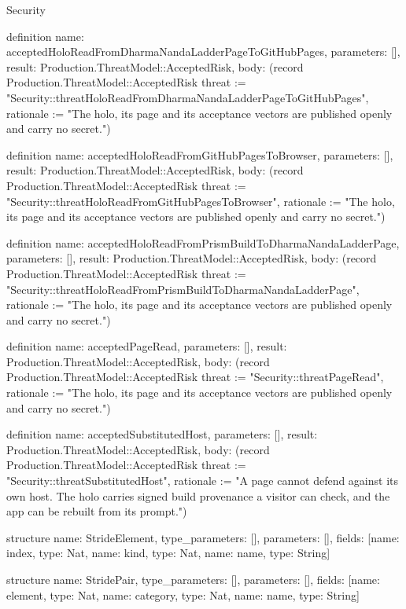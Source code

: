 \begin{lexlean}{Security}
\begin{semanticmodule}
definition{
  name: acceptedHoloReadFromDharmaNandaLadderPageToGitHubPages,
  parameters: [],
  result: Production.ThreatModel::AcceptedRisk,
  body: (record Production.ThreatModel::AcceptedRisk {threat := "Security::threatHoloReadFromDharmaNandaLadderPageToGitHubPages", rationale := "The holo, its page and its acceptance vectors are published openly and carry no secret."})
}

definition{
  name: acceptedHoloReadFromGitHubPagesToBrowser,
  parameters: [],
  result: Production.ThreatModel::AcceptedRisk,
  body: (record Production.ThreatModel::AcceptedRisk {threat := "Security::threatHoloReadFromGitHubPagesToBrowser", rationale := "The holo, its page and its acceptance vectors are published openly and carry no secret."})
}

definition{
  name: acceptedHoloReadFromPrismBuildToDharmaNandaLadderPage,
  parameters: [],
  result: Production.ThreatModel::AcceptedRisk,
  body: (record Production.ThreatModel::AcceptedRisk {threat := "Security::threatHoloReadFromPrismBuildToDharmaNandaLadderPage", rationale := "The holo, its page and its acceptance vectors are published openly and carry no secret."})
}

definition{
  name: acceptedPageRead,
  parameters: [],
  result: Production.ThreatModel::AcceptedRisk,
  body: (record Production.ThreatModel::AcceptedRisk {threat := "Security::threatPageRead", rationale := "The holo, its page and its acceptance vectors are published openly and carry no secret."})
}

definition{
  name: acceptedSubstitutedHost,
  parameters: [],
  result: Production.ThreatModel::AcceptedRisk,
  body: (record Production.ThreatModel::AcceptedRisk {threat := "Security::threatSubstitutedHost", rationale := "A page cannot defend against its own host. The holo carries signed build provenance a visitor can check, and the app can be rebuilt from its prompt."})
}

structure{
  name: StrideElement,
  type_parameters: [],
  parameters: [],
  fields: [{name: index, type: Nat}, {name: kind, type: Nat}, {name: name, type: String}]
}

structure{
  name: StridePair,
  type_parameters: [],
  parameters: [],
  fields: [{name: element, type: Nat}, {name: category, type: Nat}, {name: name, type: String}]
}


\end{semanticmodule}
\end{lexlean}
